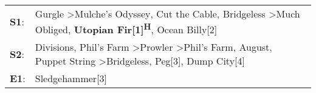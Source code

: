 \begin{supertabular}{p{0.03\textwidth}p{0.92\textwidth}}
 \textbf{S1}:  &                                                              Gurgle\textsuperscript{} \textgreater \enspace Mulche's Odyssey\textsuperscript{}, \enspace Cut the Cable\textsuperscript{}, \enspace Bridgeless\textsuperscript{} \textgreater \enspace Much Obliged\textsuperscript{}, \enspace \textbf{Utopian Fir[1]\textsuperscript{H}}, \enspace Ocean Billy[2]\textsuperscript{}  \enspace  \\
 \textbf{S2}:  &  Divisions\textsuperscript{}, \enspace Phil's Farm\textsuperscript{} \textgreater \enspace Prowler\textsuperscript{} \textgreater \enspace Phil's Farm\textsuperscript{}, \enspace August\textsuperscript{}, \enspace Puppet String\textsuperscript{} \textgreater \enspace Bridgeless\textsuperscript{}, \enspace Peg[3]\textsuperscript{}, \enspace Dump City[4]\textsuperscript{}  \enspace  \\
 \textbf{E1}:  &                                                                                                                                                                                                                                                                                                                                                    Sledgehammer[3]\textsuperscript{}  \enspace  \\
\end{supertabular}
